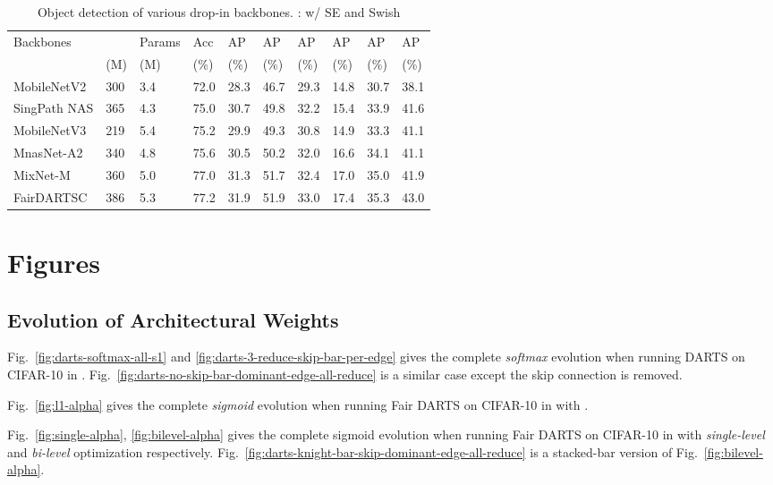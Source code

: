 \documentclass[runningheads]{llncs}
\begin{document}
\setlength{\tabcolsep}{4pt}
\begin{table}
	\begin{center}
		\caption{Object detection of various drop-in backbones. : w/ SE and Swish}
		\label{table:fairdarts-coco-retina}
		\begin{tabular}{llllllllll}
			\hline\noalign{\smallskip}
			Backbones &   & Params &Acc    & AP & AP & AP & AP & AP & AP \\
& (M) & (M) & (\%) &(\%) & (\%)& (\%)&(\%) &(\%) &(\%) \\
			\hline\noalign{\smallskip}
			MobileNetV2 \cite{sandler2018mobilenetv2} & 300 & 3.4& 72.0 & 28.3 & 46.7 & 29.3 & 14.8 & 30.7 & 38.1\\
			SingPath NAS \cite{stamoulis2019single} & 365 & 4.3 & 75.0 & 30.7 & 49.8 & 32.2 & 15.4 &33.9 & 41.6\\
MobileNetV3 \cite{howard2019searching} & 219 & 5.4 & 75.2& 29.9 & 49.3 & 30.8 & 14.9 & 33.3 & 41.1\\
			MnasNet-A2 \cite{tan2018mnasnet} & 340& 4.8 & 75.6 & 30.5 & 50.2 & 32.0 & 16.6 & 34.1 & 41.1\\
			MixNet-M \cite{tan2020mixconv} & 360 & 5.0 & 77.0 & 31.3& 51.7 & 32.4& 17.0 & 35.0 & 41.9   \\
			FairDARTSC   & 386 &5.3 & 77.2 & 31.9 & 51.9 & 33.0 & 17.4 & 35.3 & 43.0  \\
\hline
		\end{tabular}
	\end{center}
\end{table}



\section{Figures}

\subsection{Evolution of Architectural Weights}
Fig.~\ref{fig:darts-softmax-all-s1} and \ref{fig:darts-3-reduce-skip-bar-per-edge} gives the complete \emph{softmax} evolution when running DARTS on CIFAR-10 in . Fig.~\ref{fig:darts-no-skip-bar-dominant-edge-all-reduce} is a similar case except the skip connection is removed. 

Fig.~\ref{fig:l1-alpha} gives the complete \emph{sigmoid} evolution when running Fair DARTS on CIFAR-10 in  with .

Fig.~\ref{fig:single-alpha}, \ref{fig:bilevel-alpha} gives the complete sigmoid evolution when running Fair DARTS on CIFAR-10 in  with \emph{single-level} and \emph{bi-level} optimization respectively. Fig.~\ref{fig:darts-knight-bar-skip-dominant-edge-all-reduce} is a stacked-bar version of Fig.~\ref{fig:bilevel-alpha}.
\end{document}
